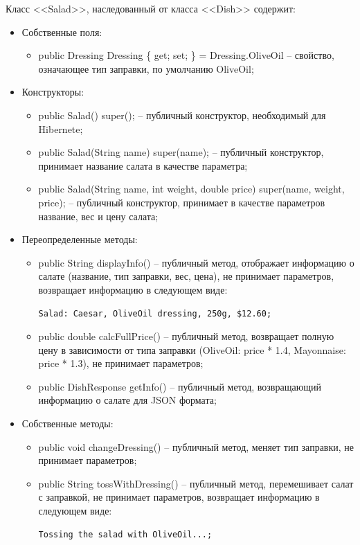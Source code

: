 \documentclass[a4paper,14pt]{extarticle}
\begin{document}
Класс <<Salad>>, наследованный от класса <<Dish>> содержит:
\begin{itemize}
  \item[--] Собственные поля:
  \begin{itemize}
    \item[--] public Dressing Dressing \{ get; set; \} = Dressing.OliveOil -- свойство, означающее тип заправки, по умолчанию OliveOil;
  \end{itemize}
  \item[--] Конструкторы:
  \begin{itemize}
    \item[--] public Salad() { super(); } -- публичный конструктор, необходимый для Hibernete;
    \item[--] public Salad(String name) { super(name); } -- публичный конструктор, принимает название салата в качестве параметра;
    \item[--] public Salad(String name, int weight, double price) { super(name, weight, price); } -- публичный конструктор, принимает в качестве параметров название, вес и цену салата;
  \end{itemize}
  \item[--] Переопределенные методы:
  \begin{itemize}
    \item[--] public String displayInfo() -- публичный метод, отображает информацию о салате (название, тип заправки, вес, цена), не принимает параметров, возвращает информацию в следующем виде:
    \begin{Verbatim}[tabsize=4]
      Salad: Caesar, OliveOil dressing, 250g, $12.60;
    \end{Verbatim}
    \item[--] public double calcFullPrice() -- публичный метод, возвращает полную цену в зависимости от типа заправки (OliveOil: price * 1.4, Mayonnaise: price * 1.3), не принимает параметров;
    \item[--] public DishResponse getInfo() -- публичный метод, возвращающий информацию о салате для JSON формата;
  \end{itemize}
  \item[--] Собственные методы:
  \begin{itemize}
    \item[--] public void changeDressing() -- публичный метод, меняет тип заправки, не принимает параметров;
    \item[--] public String tossWithDressing() -- публичный метод, перемешивает салат с заправкой, не принимает параметров, возвращает информацию в следующем виде:
    \begin{Verbatim}[tabsize=4]
      Tossing the salad with OliveOil...;
    \end{Verbatim}
  \end{itemize}
\end{itemize}
\end{document}

